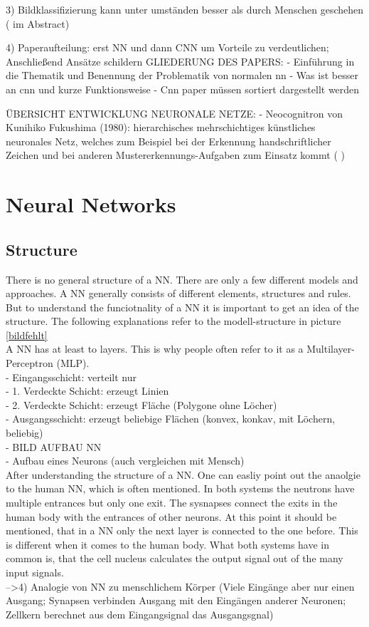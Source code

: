 \documentclass{sig-alternate-05-2015}
\begin{document}
3) Bildklassifizierung kann unter umständen besser als durch Menschen geschehen (\cite{6033458} im Abstract)

4) Paperaufteilung: erst NN und dann CNN um Vorteile zu verdeutlichen; Anschließend Ansätze schildern
GLIEDERUNG DES PAPERS:
- Einführung in die Thematik und Benennung der Problematik von normalen nn
- Was ist besser an cnn und kurze Funktionsweise
- Cnn paper müssen sortiert dargestellt werden


ÜBERSICHT ENTWICKLUNG NEURONALE NETZE: 
- Neocognitron von Kunihiko Fukushima (1980): hierarchisches mehrschichtiges künstliches neuronales Netz, welches zum Beispiel bei der Erkennung handschriftlicher Zeichen und bei anderen Mustererkennungs-Aufgaben zum Einsatz kommt ( \cite{Fukushima1980} )


\section{Neural Networks}
\subsection{Structure} \label{NNstructure}
There is no general structure of a NN. There are only a few different models and approaches. A NN generally consists of different elements, structures and rules. But to understand the funciotnality of a NN it is important to get an idea of the structure. The following explanations refer to the modell-structure in picture \ref{bildfehlt}\\
A NN has at least to layers. This is why people often refer to it as a Multilayer-Perceptron (MLP).\\

- Eingangsschicht: verteilt nur\\
- 1. Verdeckte Schicht: erzeugt Linien\\
- 2. Verdeckte Schicht: erzeugt Fläche (Polygone ohne Löcher)\\
- Ausgangsschicht: erzeugt beliebige Flächen (konvex, konkav, mit Löchern, beliebig)\\

- BILD AUFBAU NN \\
- Aufbau eines Neurons (auch vergleichen mit Mensch)\\

After understanding the structure of a NN. One can easliy point out the anaolgie to the human NN, which is often mentioned. In both systems the neutrons have multiple entrances but only one exit. The sysnapses connect the exits in the human body with the entrances of other neurons. At this point it should be mentioned, that in a NN only the next layer is connected to the one before. This is different when it comes to the human body. What both systems have in common is, that the 	cell nucleus calculates the output signal out of the many input signals. \\
-->4) Analogie von NN zu menschlichem Körper (Viele Eingänge aber nur einen Ausgang; Synapsen verbinden Ausgang mit den Eingängen anderer Neuronen; Zellkern berechnet aus dem Eingangsignal das Ausgangsgnal)
\end{document}
